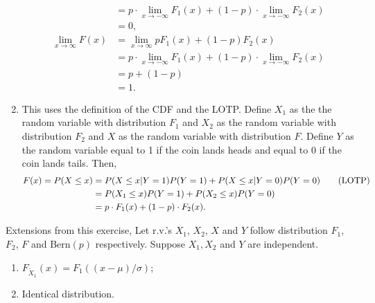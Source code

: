 \begin{exercise}
\begin{solution}
\begin{enumerate}
\begin{align*}
				& =p\cdot  \lim_{x\rightarrow-\infty} F_1(x) + (1-p) \cdot  \lim_{x\rightarrow-\infty} F_{2}(x)\\
				& = 0,\\
				\lim_{x\rightarrow \infty}F(x)& = \lim_{x\rightarrow \infty} pF_1(x) + (1-p)F_{2}(x)\\
				& =p\cdot  \lim_{x\rightarrow-\infty} F_1(x) + (1-p) \cdot  \lim_{x\rightarrow-\infty} F_{2}(x)\\
				& = p + (1-p)\\
				& = 1.
			\end{align*}
			\item This uses the definition of the CDF and the LOTP. Define $X_{1}$ as the the random variable with distribution $F_{1}$ and $X_{2}$ as the random variable with distribution $F_{2}$ and $X$ as the random variable with distribution $F$. Define $Y$ as the random variable equal to 1 if the coin lands heads and equal to 0 if the coin lands tails. Then,
			\begin{align*}
				F(x)=P(X\leq x)& = P(X\leq x|Y=1)P(Y=1) +  P(X\leq x|Y=0)P(Y=0)\tag*{(\text{LOTP})}\\
				&= P(X_{1}\leq x)P(Y=1) + P(X_{2}\leq x)P(Y=0)\\
				&= p\cdot F_{1}(x) + (1-p)\cdot F_{2}(x).
			\end{align*} 
		\end{enumerate}
	Extensions from this exercise, Let r.v.'s $X_1$, $X_2$, $X$ and $Y$ follow distribution $F_1$, $F_2$, $F$ and Bern$(p)$ respectively. Suppose $X_1,X_2$ and $Y$ are independent.
	\begin{enumerate}
		\item $F_{\tilde{X}_1}(x)=F_1((x-\mu)/\sigma)$;
		\item Identical distribution.
	\end{enumerate}
	\end{solution}
\end{exercise}
